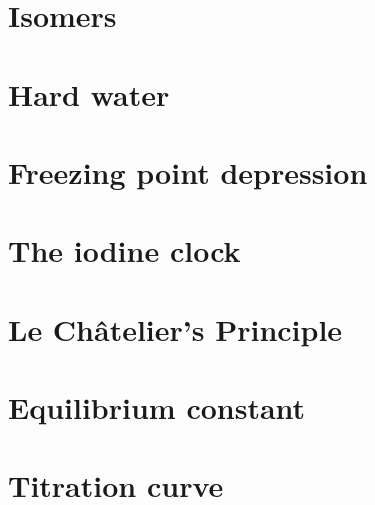 \documentclass{book}
\begin{document}
%
%
%
 \newpage\section{Isomers }
 \newpage  \section{Hard water }
  \newpage  \section{Freezing point depression }
  \newpage  \section{The iodine clock }
 \newpage  \section{Le Ch\^atelier's Principle}
 \newpage  \section{Equilibrium constant}

\newpage  \section{Titration curve}
\end{document}
